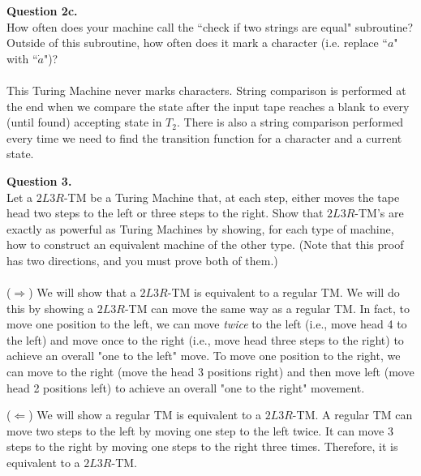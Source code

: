 \documentclass{article}
\newenvironment{question}[2]
{
    {\large \textbf{Question #1.}}\\
    #2\\\\
}{\newpage}
\begin{document}
\begin{question}
    {2c}
    { How often does your machine call the ``check if two strings are equal" subroutine?
        Outside of this subroutine, how often does it mark a character (i.e. replace ``$a$" with ``$\dot{a}$")?}

    This Turing Machine never marks characters. String comparison is performed at the end when we compare the state after the input tape reaches a blank
    to every (until found) accepting state in $T_2$. There is also a string comparison performed every time we need to find the transition function
    for a character and a current state.
\end{question}

\begin{question}
    {3}
    {Let a $2L3R$-TM be a Turing Machine that, at each step, either moves the tape head two steps to the left or three steps to the right.
        Show that $2L3R$-TM's are exactly as powerful as Turing Machines by showing, for each type of machine, how to construct an equivalent machine
        of the other type. (Note that this proof has two directions, and you must prove both of them.)}

    ($\Rightarrow$) We will show that a $2L3R$-TM is equivalent to a regular TM. We will do this by showing a $2L3R$-TM can move the same way as a regular
    TM. In fact, to move one position to the left, we can move \emph{twice} to the left (i.e., move head 4 to the left) and move once to the right
    (i.e., move head three steps to the right) to achieve an overall "one to the left" move. To move one position to the right, we can move to the right
    (move the head 3 positions right) and then move left (move head 2 positions left) to achieve an overall "one to the right" movement.

    ($\Leftarrow$) We will show a regular TM is equivalent to a $2L3R$-TM. A regular TM can move two steps to the left by moving one step to the left twice.
    It can move 3 steps to the right by moving one steps to the right three times. Therefore, it is equivalent to a $2L3R$-TM.
\end{question}
\end{document}

